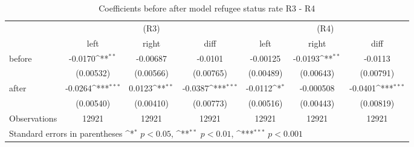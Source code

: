 \begin{table}[!ht]\centering \footnotesize
\def\sym#1{\ifmmode^{#1}\else\(^{#1}\)\fi}
\caption{Coefficients before after model refugee status rate R3 - R4}
\begin{tabular}{l*{6}{c}}
\hline\hline
                    &\multicolumn{3}{c}{(R3)}&\multicolumn{3}{c}{(R4)}\\
&\multicolumn{1}{c}{left}&\multicolumn{1}{c}{right}&\multicolumn{1}{c}{diff}&\multicolumn{1}{c}{left}&\multicolumn{1}{c}{right}&\multicolumn{1}{c}{diff}\\
\hline
before              &     -0.0170\sym{**} &    -0.00687         &     -0.0101         &    -0.00125         &     -0.0193\sym{**} &     -0.0113         \\
                    &   (0.00532)         &   (0.00566)         &   (0.00765)         &   (0.00489)         &   (0.00643)         &   (0.00791)         \\
[0,5em]
after               &     -0.0264\sym{***}&      0.0123\sym{**} &     -0.0387\sym{***}&     -0.0112\sym{*}  &   -0.000508         &     -0.0401\sym{***}\\
                    &   (0.00540)         &   (0.00410)         &   (0.00773)         &   (0.00516)         &   (0.00443)         &   (0.00819)         \\
\hline
Observations        &       12921         &       12921         &       12921         &       12921         &       12921         &       12921         \\
\hline\hline
\multicolumn{7}{l}{\footnotesize Standard errors in parentheses \sym{*} \(p<0.05\), \sym{**} \(p<0.01\), \sym{***} \(p<0.001\)}\\
\end{tabular}
\end{table}
